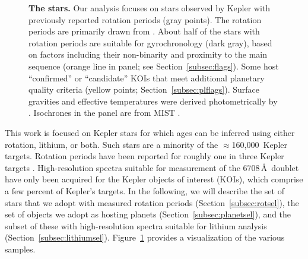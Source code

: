 \documentclass[11pt,twocolumn,tighten]{aastex63}
\newcommand{\nkeplerstars}{$\approx$160{,}000}
\begin{document}
\begin{figure}[!t]
\begin{center}
		\vspace{-0.3cm}
	\end{center}
	\vspace{-0.5cm}
  \caption{{\bf The stars.}  Our analysis focuses on stars observed by
  Kepler with previously reported rotation periods (gray points).  The
  rotation periods are primarily drawn from
  \citet{Santos_2019,Santos_2021}.  About half of the stars with
  rotation periods are suitable for gyrochronology (dark gray),
  based on factors including their non-binarity and proximity to the
  main sequence (orange line in  panel; see
  Section~\ref{subsec:flags}).  Some host ``confirmed'' or
  ``candidate'' KOIs that meet additional planetary quality criteria
  (yellow points; Section~\ref{subsec:plflags}).  Surface gravities
  and effective temperatures were derived photometrically by
  \citet{Berger_2020a_catalog}.  Isochrones in the  panel are
  from MIST \citep{Choi_2016}.
	}
	\label{fig:stellarprops}
\end{figure}

This work is focused on Kepler stars for which ages can be inferred
using either rotation, lithium, or both.  Such stars are a minority of
the \nkeplerstars\ Kepler targets.  Rotation periods have been
reported for roughly one in three Kepler targets
\citep[e.g.][]{McQuillan_2014,Santos_2021}.  High-resolution spectra
suitable for measurement of the  6708\,\AA\ doublet have
only been acquired for the Kepler objects of interest (KOIs), which
comprise a few percent of Kepler's targets.  In the following, we will
describe the set of stars that we adopt with measured rotation periods
(Section~\ref{subsec:rotsel}), the set of objects we adopt as hosting
planets (Section~\ref{subsec:planetsel}), and the subset of these with
high-resolution spectra suitable for lithium analysis
(Section~\ref{subsec:lithiumsel}).  Figure~\ref{fig:stellarprops}
provides a visualization of the various samples.
\end{document}
